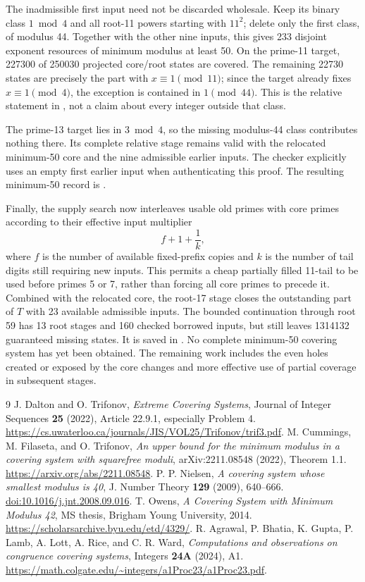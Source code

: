 \documentclass[11pt]{article}
\begin{document}
The inadmissible first input need not be discarded wholesale. Keep its
binary class $1\bmod4$ and all root-11 powers starting with $11^2$; delete
only the first class, of modulus 44. Together with the other nine inputs,
this gives 233 disjoint exponent resources of minimum modulus at least 50.
On the prime-11 target, 227300 of 250030 projected core/root states are
covered. The remaining 22730 states are precisely the part with
$x\equiv1\pmod{11}$; since the target already fixes $x\equiv1\pmod4$,
the exception is contained in $1\pmod{44}$. This is the relative statement
in , not a
claim about every integer outside that class.

The prime-13 target lies in $3\bmod4$, so the missing modulus-44 class
contributes nothing there. Its complete relative stage remains valid with
the relocated minimum-50 core and the nine admissible earlier inputs.
The checker explicitly uses an empty first earlier input when authenticating
this proof. The resulting minimum-50 record is
.

Finally, the supply search now interleaves usable old primes with core
primes according to their effective input multiplier
\[
 f+1+\frac1k,
\]
where $f$ is the number of available fixed-prefix copies and $k$ is the
number of tail digits still requiring new inputs. This permits a cheap
partially filled 11-tail to be used before primes 5 or 7, rather than
forcing all core primes to precede it. Combined with the relocated core,
the root-17 stage closes the outstanding part of $T$ with 23 available
admissible inputs. The bounded continuation through root 59 has 13 root
stages and 160 checked borrowed inputs, but still leaves 1314132 guaranteed
missing states. It is saved in
.
No complete minimum-50 covering system has yet been obtained. The remaining
work includes the even holes created or exposed by the core changes and
more effective use of partial coverage in subsequent stages.

\begin{thebibliography}{9}
 J. Dalton and O. Trifonov,
\emph{Extreme Covering Systems}, Journal of Integer Sequences
\textbf{25} (2022), Article 22.9.1, especially Problem 4.
\url{https://cs.uwaterloo.ca/journals/JIS/VOL25/Trifonov/trif3.pdf}.
 M. Cummings, M. Filaseta, and O. Trifonov,
\emph{An upper bound for the minimum modulus in a covering system with
squarefree moduli}, arXiv:2211.08548 (2022), Theorem 1.1.
\url{https://arxiv.org/abs/2211.08548}.
 P. P. Nielsen,
\emph{A covering system whose smallest modulus is 40},
J. Number Theory \textbf{129} (2009), 640--666.
\href{https://doi.org/10.1016/j.jnt.2008.09.016}{doi:10.1016/j.jnt.2008.09.016}.
 T. Owens,
\emph{A Covering System with Minimum Modulus 42},
MS thesis, Brigham Young University, 2014.
\url{https://scholarsarchive.byu.edu/etd/4329/}.
 R. Agrawal, P. Bhatia, K. Gupta, P. Lamb, A. Lott,
A. Rice, and C. R. Ward,
\emph{Computations and observations on congruence covering systems},
Integers \textbf{24A} (2024), A1.
\url{https://math.colgate.edu/~integers/a1Proc23/a1Proc23.pdf}.
\end{thebibliography}
\end{document}
